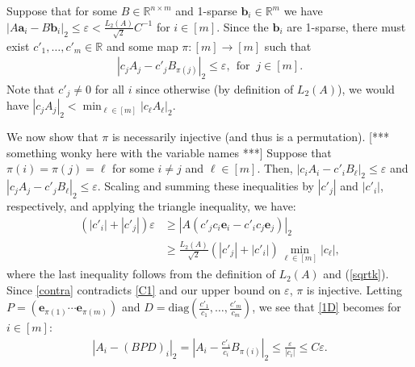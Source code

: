 \documentclass[journal, twocolumn]{IEEEtran}
\begin{document}
Suppose that for some $B \in \mathbb{R}^{n \times m}$ and 1-sparse $\mathbf{b}_i \in \mathbb{R}^m$ we have  $|A\mathbf{a}_i - B\mathbf{b}_i|_2 \leq \varepsilon < \frac{L_2(A)}{\sqrt{2}}C^{-1}$ for $i \in [m]$. Since the $\mathbf{b}_i$ are 1-sparse, there must exist $c'_1, \ldots, c'_m \in \mathbb{R}$ and some map $\pi: [m] \to [m]$ such that 
\begin{align}\label{1D}
|c_jA_j - c'_jB_{\pi(j)}|_2 \leq \varepsilon, \ \ \text{for } \  j \in [m].
\end{align} 
Note that $c'_j \neq 0$ for all $i$ since otherwise (by definition of $L_2(A)$), we would have $|c_jA_j|_2 < \min_{\ell \in [m]}|c_{\ell}A_{\ell}|_2$. 

We  now show that $\pi$ is necessarily injective (and thus is a permutation). [*** something wonky here with the variable names ***]  Suppose that $\pi(i) = \pi(j) = \ell$ for some $i \neq j$ and $\ell \in [m]$. Then, $|c_iA_i - c'_iB_{\ell}|_2  \leq \varepsilon$ and $|c_jA_j - c'_jB_{\ell}|_2 \leq \varepsilon$. Scaling and summing these inequalities by $|c'_j|$ and $|c'_i|$, respectively, and applying the triangle inequality, we have:
\begin{align}\label{contra}
(|c'_i| + |c'_j|) \varepsilon
&\geq |A(c'_jc_i\mathbf{e}_i - c'_ic_j\mathbf{e}_j)|_2 \nonumber \\ 
&\geq \frac{L_2(A)}{\sqrt{2}} \left( |c'_j| + |c'_i| \right) \min_{\ell \in [m]} |c_\ell |,
\end{align}
%
where the last inequality follows from the definition of $L_2(A)$ and (\ref{sqrtk}). Since \eqref{contra} contradicts \eqref{C1} and our upper bound on $\varepsilon$, $\pi$ is injective. Letting $P = \left( \mathbf{e}_{\pi(1)} \cdots \mathbf{e}_{\pi(m)}\right)$ and $D = \text{diag}(\frac{c'_1}{c_1},\ldots,\frac{c'_m}{c_m})$, we see that \eqref{1D} becomes for $i \in [m]$:
\begin{align}\label{k=1result}
|A_i - (BPD)_i|_2 = |A_i - \frac{c'_i}{c_i}B_{\pi(i)}|_2 \leq \frac{\varepsilon}{|c_i|} \leq C\varepsilon.
\end{align}
\end{document}
